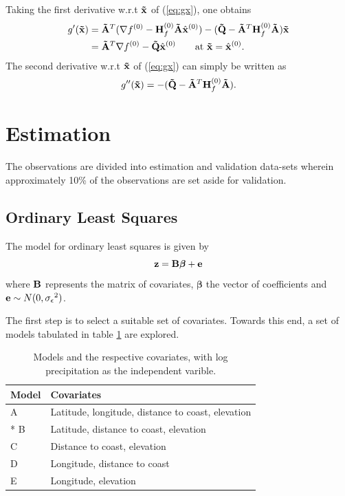 \documentclass[a4paper,10pt]{article}
\def\bB{{\bf B}}
\def\bH{{\bf H}}
\def\btQ{{\bf \tilde Q}}
\def\btA{{\bf \tilde A}}
\def\bx{{\bf x}}
\def\be{{\bf e}}
\def\bz{{\bf z}}
\def\btx{{\bf{\tilde x}}}
\def\bbeta{{\boldsymbol \beta}}
\def\sigmaeps{{\sigma_{\epsilon}}}
\begin{document}
Taking the first derivative w.r.t $\btx$ of (\ref{eq:gx}), one obtains
\begin{align}
 g'(\btx) &= \btA^T (\nabla f^{(0)} - \bH_f^{(0)} \btA \hat \bx^{(0)}) - (\btQ - \btA^T \bH_f^{(0)} \btA) \btx \nonumber \\
	  &= \btA^T \nabla f^{(0)} - \btQ \hat \bx^{(0)} \qquad \mathrm{at~} \btx = \hat \bx^{(0)}.
\end{align}
The second derivative w.r.t $\btx$ of (\ref{eq:gx}) can simply be written as
\begin{equation}
 g''(\btx) = -(\btQ - \btA^T \bH_f^{(0)} \btA).
\end{equation}

\section{Estimation}
The observations are divided into estimation and validation data-sets wherein approximately 10\% of the observations are set aside for validation.
\subsection{Ordinary Least Squares}
The model for ordinary least squares is given by
\begin{equation*}
 \bz = \bB \bbeta + \be
\end{equation*}
where $\bB$ represents the matrix of covariates, $\bbeta$ the vector of coefficients and $\be \sim N(0,\sigmaeps^2)$.

The first step is to select a suitable set of covariates. Towards this end, a set of models tabulated in table \ref{tab:models} are explored.
\begin{table}[H]
\centering
\begin{tabular}{lp{9cm}}
\hline
{\bf Model} & {\bf Covariates} \\
\hline
 A & Latitude, longitude, distance to coast, elevation\\
 * B & Latitude, distance to coast, elevation\\
 C & Distance to coast, elevation\\
 D & Longitude, distance to coast\\
 E & Longitude, elevation\\
\hline
\end{tabular}
\caption{Models and the respective covariates, with log precipitation as the independent varible.}
\label{tab:models}
\end{table}
\end{document}
